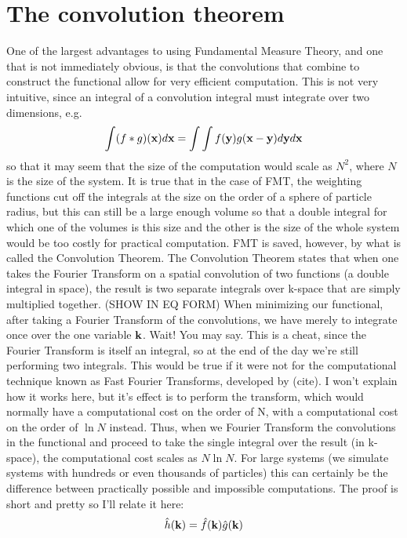 \section{The convolution theorem}

One of the largest advantages to using Fundamental Measure Theory, and
one that is not immediately obvious, is that the convolutions that
combine to construct the functional allow for very efficient
computation.  This is not very intuitive, since an integral of a
convolution integral must integrate over two dimensions, e.g.
\begin{align}
\int(f\ast g)(\textbf{x})d\textbf{x} = \int \int f(\textbf{y})g(\textbf{x}-\textbf{y})d\textbf{y} d\textbf{x}
\end{align}
so that it may seem that the size of the computation would scale as
$N^2$, where $N$ is the size of the system.  It is true that in the
case of FMT, the weighting functions cut off the integrals at the size
on the order of a sphere of particle radius, but this can still be a
large enough volume so that a double integral for which one of the
volumes is this size and the other is the size of the whole system
would be too costly for practical computation.  FMT is saved, however,
by what is called the Convolution Theorem.  The Convolution Theorem
states that when one takes the Fourier Transform on a spatial
convolution of two functions (a double integral in space), the result
is two separate integrals over k-space that are simply multiplied
together.  (SHOW IN EQ FORM) When minimizing our functional, after
taking a Fourier Transform of the convolutions, we have merely to
integrate once over the one variable $\textbf{k}$.  Wait!  You may say.  This
is a cheat, since the Fourier Transform is itself an integral, so at
the end of the day we're still performing two integrals.  This would
be true if it were not for the computational technique known as Fast
Fourier Transforms, developed by (cite).  I won't explain how it works
here, but it's effect is to perform the transform, which would
normally have a computational cost on the order of N, with a
computational cost on the order of $\ln N$ instead.  Thus, when we
Fourier Transform the convolutions in the functional and proceed to
take the single integral over the result (in k-space), the
computational cost scales as $N \ln N$.  For large systems (we
simulate systems with hundreds or even thousands of particles) this
can certainly be the difference between practically possible and
impossible computations.  The proof is short and pretty so I'll relate
it here:
\begin{align}
\hat{h}(\textbf{k}) = \hat{f}(\textbf{k})\hat{g}(\textbf{k})
\end{align}
